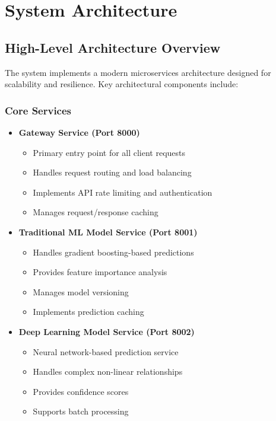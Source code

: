 \documentclass[12pt,a4paper]{report}
\begin{document}
\section{System Architecture}
\subsection{High-Level Architecture Overview}
The system implements a modern microservices architecture designed for scalability and resilience. Key architectural components include:

\subsubsection{Core Services}
\begin{itemize}
    \item \textbf{Gateway Service (Port 8000)}
    \begin{itemize}
        \item Primary entry point for all client requests
        \item Handles request routing and load balancing
        \item Implements API rate limiting and authentication
        \item Manages request/response caching
    \end{itemize}
    
    \item \textbf{Traditional ML Model Service (Port 8001)}
    \begin{itemize}
        \item Handles gradient boosting-based predictions
        \item Provides feature importance analysis
        \item Manages model versioning
        \item Implements prediction caching
    \end{itemize}
    
    \item \textbf{Deep Learning Model Service (Port 8002)}
    \begin{itemize}
        \item Neural network-based prediction service
        \item Handles complex non-linear relationships
        \item Provides confidence scores
        \item Supports batch processing
    \end{itemize}
\end{itemize}
\end{document}
